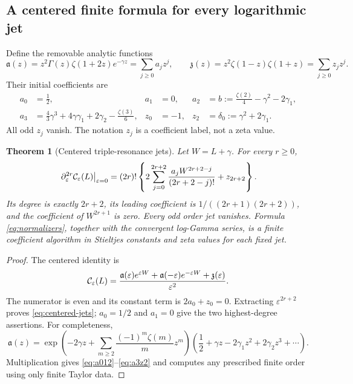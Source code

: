 \documentclass[11pt,a4paper]{article}
\numberwithin{equation}{section}
\newtheorem{theorem}{Theorem}[section]
\theoremstyle{definition}\newtheorem{definition}[theorem]{Definition}
\theoremstyle{remark}\newtheorem{remark}[theorem]{Remark}
\newcommand{\eps}{\varepsilon}
\newcommand{\ua}{\mathfrak a}\newcommand{\uz}{\mathfrak z}
\begin{document}
\subsection{A centered finite formula for every logarithmic jet}
Define the removable analytic functions
\begin{equation}\label{eq:normalizers}
 \ua(z)=z^2\Gamma(z)\zeta(1+2z)e^{-\gamma z}
       =\sum_{j\ge0}a_jz^j,\qquad
 \uz(z)=z^2\zeta(1-z)\zeta(1+z)=\sum_{j\ge0}z_jz^j.
\end{equation}
Their initial coefficients are
\begin{align}
 a_0&=\tfrac12,&a_1&=0,&a_2&=b:=\frac{\zeta(2)}4-\gamma^2-2\gamma_1,
 \label{eq:a012}\\
 a_3&=\frac43\gamma^3+4\gamma\gamma_1+2\gamma_2-\frac{\zeta(3)}6,
 &z_0&=-1,&z_2&=\delta_0:=\gamma^2+2\gamma_1.
 \label{eq:a3z2}
\end{align}
All odd $z_j$ vanish. The notation $z_j$ is a coefficient label, not a
zeta value.

\begin{theorem}[Centered triple-resonance jets]
\label{thm:centered-jets}
Let $W=L+\gamma$. For every $r\ge0$,
\begin{equation}\label{eq:centered-jets}
 \left.\partial_\eps^{2r}\CC_\eps(L)\right|_{\eps=0}
 =(2r)!\left\{2\sum_{j=0}^{2r+2}
       {a_jW^{2r+2-j}\over(2r+2-j)!}+z_{2r+2}\right\}.
\end{equation}
Its degree is exactly $2r+2$, its leading coefficient is
$1/((2r+1)(2r+2))$, and the coefficient of $W^{2r+1}$ is zero.
Every odd order jet vanishes. Formula \eqref{eq:normalizers}, together
with the convergent log-Gamma series, is a finite coefficient algorithm
in Stieltjes constants and zeta values for each fixed jet.
\end{theorem}
\begin{proof}
The centered identity is
\begin{equation}\label{eq:centered-core}
 \CC_\eps(L)=\frac{
 \ua(\eps)e^{\eps W}+\ua(-\eps)e^{-\eps W}+\uz(\eps)}{\eps^2}.
\end{equation}
The numerator is even and its constant term is $2a_0+z_0=0$.
Extracting $\eps^{2r+2}$ proves \eqref{eq:centered-jets};
$a_0=1/2$ and $a_1=0$ give the two highest-degree assertions.
For completeness,
\[
 \ua(z)=\exp\left(-2\gamma z+
       \sum_{m\ge2}\frac{(-1)^m\zeta(m)}m z^m\right)
       \left(\frac12+\gamma z-2\gamma_1z^2+2\gamma_2z^3+\cdots\right).
\]
Multiplication gives \eqref{eq:a012}--\eqref{eq:a3z2} and computes
any prescribed finite order using only finite Taylor data.
\end{proof}
\end{document}
